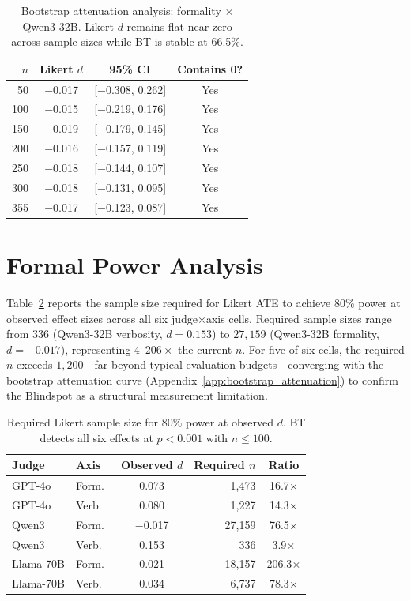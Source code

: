 \begin{table}[h]
\centering
\small
\caption{Bootstrap attenuation analysis: formality $\times$ Qwen3-32B. Likert $d$ remains flat near zero across sample sizes while BT is stable at 66.5\%.}
\label{tab:attenuation}
\begin{tabular}{@{}rccc@{}}
\toprule
$n$ & Likert $d$ & 95\% CI & Contains 0? \\
\midrule
50 & $-$0.017 & [$-$0.308, 0.262] & Yes \\
100 & $-$0.015 & [$-$0.219, 0.176] & Yes \\
150 & $-$0.019 & [$-$0.179, 0.145] & Yes \\
200 & $-$0.016 & [$-$0.157, 0.119] & Yes \\
250 & $-$0.018 & [$-$0.144, 0.107] & Yes \\
300 & $-$0.018 & [$-$0.131, 0.095] & Yes \\
355 & $-$0.017 & [$-$0.123, 0.087] & Yes \\
\bottomrule
\end{tabular}
\end{table}

\section{Formal Power Analysis}
\label{app:power_analysis}

Table~\ref{tab:power} reports the sample size required for Likert ATE to achieve 80\% power at observed effect sizes across all six judge$\times$axis cells.
Required sample sizes range from $336$ (Qwen3-32B verbosity, $d = 0.153$) to $27{,}159$ (Qwen3-32B formality, $d = {-}0.017$), representing $4$--$206\times$ the current $n$.
For five of six cells, the required $n$ exceeds $1{,}200$---far beyond typical evaluation budgets---converging with the bootstrap attenuation curve (Appendix~\ref{app:bootstrap_attenuation}) to confirm the Blindspot as a structural measurement limitation.

\begin{table}[h]
\centering
\small
\caption{Required Likert sample size for 80\% power at observed $d$. BT detects all six effects at $p < 0.001$ with $n \leq 100$.}
\label{tab:power}
\begin{tabular}{@{}llcrc@{}}
\toprule
Judge & Axis & Observed $d$ & Required $n$ & Ratio \\
\midrule
GPT-4o & Form.\ & 0.073 & 1{,}473 & 16.7$\times$ \\
GPT-4o & Verb.\ & 0.080 & 1{,}227 & 14.3$\times$ \\
Qwen3 & Form.\ & $-$0.017 & 27{,}159 & 76.5$\times$ \\
Qwen3 & Verb.\ & 0.153 & 336 & 3.9$\times$ \\
Llama-70B & Form.\ & 0.021 & 18{,}157 & 206.3$\times$ \\
Llama-70B & Verb.\ & 0.034 & 6{,}737 & 78.3$\times$ \\
\bottomrule
\end{tabular}
\end{table}

